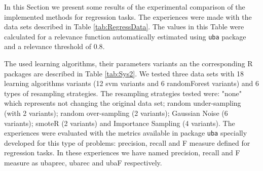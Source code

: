\documentclass[10pt,a4paper]{article}\usepackage[]{graphicx}\usepackage[]{color}
\begin{document}
In this Section we present some results of the experimental comparison of the implemented methods for regression tasks. 
The experiences were made with the data sets described in Table \ref{tab:RegressData}. The values in this Table were calculated for a relevance function automatically estimated using \texttt{uba} package and a relevance threshold of $0.8$.

\begin{table}[!tbp]
\begin{center}
\end{center}
\caption{Regression Data sets and characteristics evaluated for a relevance function automatically determined with \texttt{uba} package and a relevance threshold of 0.8 (tgt: name of target variable; N: nr. of examples; Pnom: nr. of nominal predictors; Pnum: nr. of numeric predictors; nRare: nr. of examples in the rare class; \%Rare: nRare/N; Nrel bump: nr. of relevant bumps automatically determined).}
\label{tab:RegressData}
\end{table}


The used learning algorithms, their parameters variants an the corresponding R packages are described in Table \ref{tab:Sys2}. We tested three data sets with 18 learning algorithms variants (12 svm variants and 6 randomForest variants) and 6 types of resampling strategies. The resampling strategies tested were: "none" which represents not changing the original data set; random under-sampling (with 2 variants); random over-sampling (2 variants); Gaussian Noise (6 variants); smoteR (2 variants) and Importance Sampling (4 variants). The experiences were evaluated with the metrics available in package \texttt{uba} specially developed for this type of problems: precision, recall and F measure defined for regression tasks. In these experiences we have named precision, recall and F measure as ubaprec, ubarec and ubaF respectively.
\end{document}
